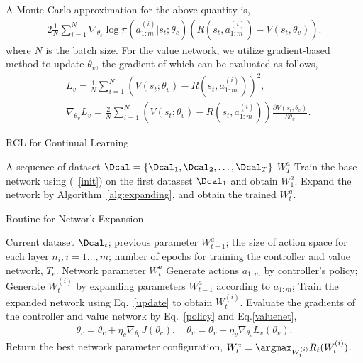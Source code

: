 \documentclass{article}
\begin{document}
A Monte Carlo approximation for the above quantity is,
\begin{alignat}{2}
\label{policy}
\frac{1}{N}\sum_{i=1}^N\nabla_{\theta_c}\log \pi(a_{1:m}^{(i)}|s_t;\theta_c)\left(R(s_t,a_{1:m}^{(i)})-V(s_t,\theta_v)\right).
\end{alignat}
where $N$ is the batch size. For the value network, we utilize  gradient-based method to update $\theta_v$, the gradient of which can be evaluated as follows,
\begin{align}
\label{valuenet}
&L_v = \frac{1}{N}\sum_{i=1}^N(V(s_t;\theta_v) - R(s_t,a^{(i)}_{1:m}))^2, \nonumber \\
&\nabla_{\theta_v} L_v = \frac{2}{N}\sum_{i=1}^N\left( V(s_t;\theta_v) - R(s_t,a^{(i)}_{1:m}) \right) \frac{\partial V(s_t;\theta_v)}{\partial \theta_v}.
\end{align}


\begin{algorithm}[tb]
  \caption{RCL for Continual Learning}
  \label{alg:rcl}
  \begin{algorithmic}[1]
     A sequence of dataset $\Dcal=\{ \Dcal_1, \Dcal_2,\dots,\Dcal_T \}$
     $W_T^a$
    \STATE Train the base network using (~\ref{init}) on the first datasest $\Dcal_1$ and obtain $W_1^a$.
    \ELSE
    \STATE Expand  the network by Algorithm~\ref{alg:expanding}, and obtain the trained  $W_t^a$.
    \ENDIF
    \ENDFOR
  \end{algorithmic}
\end{algorithm}

\begin{algorithm}[tb]
  \caption{Routine for Network Expansion}
  \label{alg:expanding}
  \begin{algorithmic}[1]
     Current dataset $\Dcal_t$; previous parameter $W_{t-1}^a$; the size of action space for each layer $n_i, i=1\dots,m$; number of epochs for training the controller and value network, $T_e$.
     Network parameter $W_t^a$
    \STATE Generate actions $a_{1:m}$ by controller's policy;
    \STATE Generate $W_t^{(i)}$ by expanding parameters $W_{t-1}^a$ according to $a_{1:m}$;
    \STATE Train the expanded network using Eq.~\eqref{update} to obtain $W_t^{(i)}$.
    \STATE Evaluate the gradients of the controller and value network by Eq.~\eqref{policy} and Eq.\eqref{valuenet},
    \begin{align}
    \theta_c = \theta_c + \eta_c \nabla_{\theta_c}J(\theta_c), \quad
    \theta_v = \theta_v - \eta_v \nabla_{\theta_v}L_v(\theta_v). \nonumber
    \end{align}
    \ENDFOR
    \STATE Return the best network parameter configuration, $W_t^a = \argmax_{W_t^{(i)}} R_t(W_t^{(i)})$.
  \end{algorithmic}
\end{algorithm}
\end{document}
